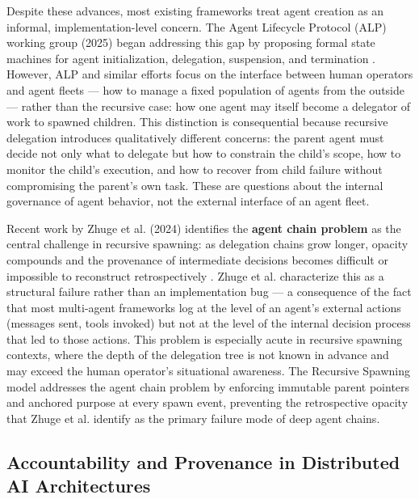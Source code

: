 {{Despite these advances, most existing frameworks treat agent creation as an informal, implementation-level concern. The Agent Lifecycle Protocol (ALP) working group (2025) began addressing this gap by proposing formal state machines for agent initialization, delegation, suspension, and termination \cite{alp2025}. However, ALP and similar efforts focus on the interface between human operators and agent fleets — how to manage a fixed population of agents from the outside — rather than the recursive case: how one agent may itself become a delegator of work to spawned children. This distinction is consequential because recursive delegation introduces qualitatively different concerns: the parent agent must decide not only what to delegate but how to constrain the child's scope, how to monitor the child's execution, and how to recover from child failure without compromising the parent's own task. These are questions about the internal governance of agent behavior, not the external interface of an agent fleet.

Recent work by Zhuge et al. (2024) identifies the \textbf{agent chain problem} as the central challenge in recursive spawning: as delegation chains grow longer, opacity compounds and the provenance of intermediate decisions becomes difficult or impossible to reconstruct retrospectively \cite{zhuge2024}. Zhuge et al. characterize this as a structural failure rather than an implementation bug — a consequence of the fact that most multi-agent frameworks log at the level of an agent's external actions (messages sent, tools invoked) but not at the level of the internal decision process that led to those actions. This problem is especially acute in recursive spawning contexts, where the depth of the delegation tree is not known in advance and may exceed the human operator's situational awareness. The Recursive Spawning model addresses the agent chain problem by enforcing immutable parent pointers and anchored purpose at every spawn event, preventing the retrospective opacity that Zhuge et al. identify as the primary failure mode of deep agent chains.

\subsection{Accountability and Provenance in Distributed AI Architectures}
\label{sec:provenance}

}}
